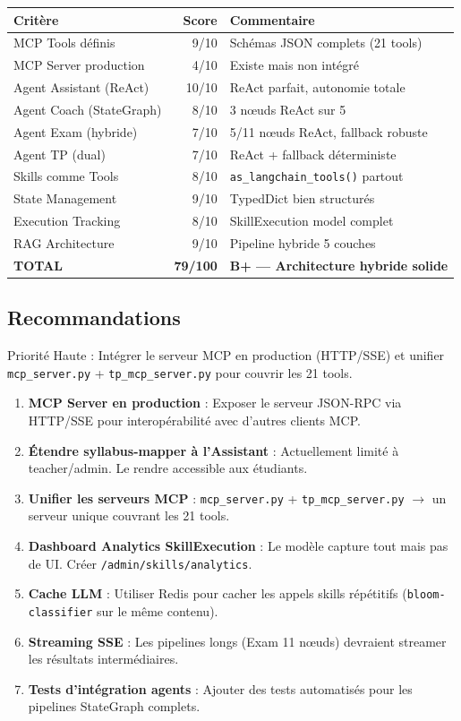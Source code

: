 \documentclass[12pt,a4paper]{article}
\begin{document}
\begin{longtable}{lrl}
\toprule
\textbf{Critère} & \textbf{Score} & \textbf{Commentaire} \\
\midrule
MCP Tools définis & 9/10 & Schémas JSON complets (21 tools) \\
MCP Server production & 4/10 & Existe mais non intégré \\
Agent Assistant (ReAct) & 10/10 & ReAct parfait, autonomie totale \\
Agent Coach (StateGraph) & 8/10 & 3 nœuds ReAct sur 5 \\
Agent Exam (hybride) & 7/10 & 5/11 nœuds ReAct, fallback robuste \\
Agent TP (dual) & 7/10 & ReAct + fallback déterministe \\
Skills comme Tools & 8/10 & \texttt{as\_langchain\_tools()} partout \\
State Management & 9/10 & TypedDict bien structurés \\
Execution Tracking & 8/10 & SkillExecution model complet \\
RAG Architecture & 9/10 & Pipeline hybride 5 couches \\
\midrule
\textbf{TOTAL} & \textbf{79/100} & \textbf{B+ --- Architecture hybride solide} \\
\bottomrule
\end{longtable}

\subsection{Recommandations}

\begin{warningbox}
Priorité Haute : Intégrer le serveur MCP en production (HTTP/SSE) et unifier \texttt{mcp\_server.py} + \texttt{tp\_mcp\_server.py} pour couvrir les 21 tools.
\end{warningbox}

\begin{enumerate}
  \item \textbf{MCP Server en production} : Exposer le serveur JSON-RPC via HTTP/SSE pour interopérabilité avec d'autres clients MCP.
  \item \textbf{Étendre syllabus-mapper à l'Assistant} : Actuellement limité à teacher/admin. Le rendre accessible aux étudiants.
  \item \textbf{Unifier les serveurs MCP} : \texttt{mcp\_server.py} + \texttt{tp\_mcp\_server.py} $\to$ un serveur unique couvrant les 21 tools.
  \item \textbf{Dashboard Analytics SkillExecution} : Le modèle capture tout mais pas de UI. Créer \texttt{/admin/skills/analytics}.
  \item \textbf{Cache LLM} : Utiliser Redis pour cacher les appels skills répétitifs (\texttt{bloom-classifier} sur le même contenu).
  \item \textbf{Streaming SSE} : Les pipelines longs (Exam 11 nœuds) devraient streamer les résultats intermédiaires.
  \item \textbf{Tests d'intégration agents} : Ajouter des tests automatisés pour les pipelines StateGraph complets.
\end{enumerate}
\end{document}
